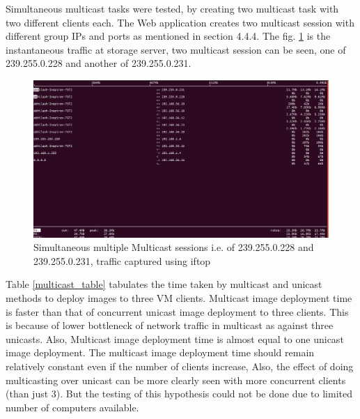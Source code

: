 \documentclass[a4paper,12pt]{article}
\begin{document}
Simultaneous multicast tasks were tested, by creating two multicast task with two different clients each. The Web application creates two multicast session with different group IPs and ports as mentioned in section 4.4.4. The fig. \ref{multicast_multiple} is the instantaneous traffic at storage server, two multicast session can be seen, one of 239.255.0.228 and another of 239.255.0.231. 
\begin{figure}
  \centering
  \includegraphics[width=1\linewidth]{multicast_multiple_iftop.png}
  \caption{Simultaneous multiple Multicast sessions i.e. of 239.255.0.228 and 239.255.0.231, traffic captured using iftop}
  \label{multicast_multiple}
\end{figure}

Table \ref{multicast_table} tabulates the time taken by multicast and unicast methods to deploy images to three VM clients. Multicast image deployment time is faster than that of concurrent unicast image deployment  to three clients. This is because of lower bottleneck of network traffic in multicast as against three unicasts. Also, Multicast image deployment time is almost equal to one unicast image deployment. The multicast image deployment time should remain relatively constant even if the number of clients increase, Also, the effect of  doing multicasting over unicast can be more clearly seen with more concurrent clients (than just 3). But the testing of this hypothesis could not be done due to limited number of computers available. 
\end{document}
